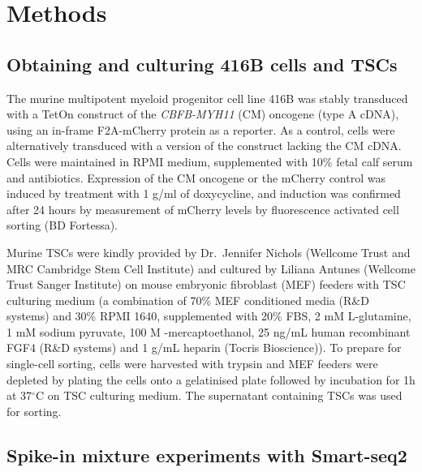 \documentclass{article}
\begin{document}
\section*{Methods}

\subsection*{Obtaining and culturing 416B cells and TSCs}

The murine multipotent myeloid progenitor cell line 416B \citep{dexter1979isolation} was stably transduced with a TetOn construct of the \textit{CBFB-MYH11} (CM) oncogene (type A cDNA), using an in-frame F2A-mCherry protein as a reporter. 
As a control, cells were alternatively transduced with a version of the construct lacking the CM cDNA. 
Cells were maintained in RPMI medium, supplemented with 10\% fetal calf serum and antibiotics.
Expression of the CM oncogene or the mCherry control was induced by treatment with 1 \textmu{}g/ml of doxycycline, and induction was confirmed after 24 hours by measurement of mCherry levels by fluorescence activated cell sorting (BD Fortessa).

Murine TSCs were kindly provided by Dr.\ Jennifer Nichols (Wellcome Trust and MRC Cambridge Stem Cell Institute) and cultured by Liliana Antunes (Wellcome Trust Sanger Institute) on mouse embryonic fibroblast (MEF) feeders with TSC culturing medium (a combination of 70\% MEF conditioned media (R\&D systems) and 30\% RPMI 1640, supplemented with 20\% FBS, 2 mM L-glutamine, 1 mM sodium pyruvate, 100 \textmu{}M \textbeta{}-mercaptoethanol, 25 ng/mL human recombinant FGF4 (R\&D systems) and 1 \textmu{}g/mL heparin (Tocris Bioscience)). 
To prepare for single-cell sorting, cells were harvested with trypsin and MEF feeders were depleted by plating the cells onto a gelatinised plate followed by incubation for 1h at 37$^{\circ}$C on TSC culturing medium. 
The supernatant containing TSCs was used for sorting.

\subsection*{Spike-in mixture experiments with Smart-seq2}
\end{document}
